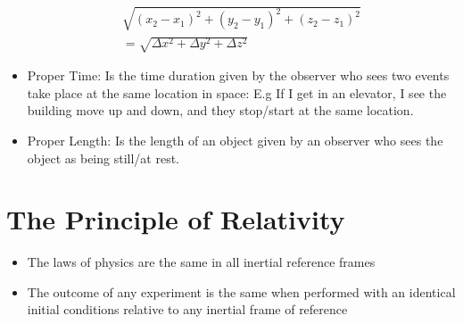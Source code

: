 \documentclass[10pt]{report}
\begin{document}
\begin{itemize}
{\begin{align*}
	\sqrt{\left(x_{2}-x_{1}\right)^{2}+\left(y_{2}-y_{1}\right)^{2}+\left(z_{2}-z_{1}\right)^{2}} \\=\sqrt{\Delta x^{2}+\Delta y^{2}+\Delta z^{2}}
\end{align*}
	}
	\item{Proper Time: Is the time duration given by the observer who sees two events take place at the same location in space: E.g If I get in an elevator, I see the building move up and down, and they stop/start at the same location.}
	\item{Proper Length: Is the length of an object given by an observer who sees the object as being still/at rest.}
\end{itemize}
\section{The Principle of Relativity}
\begin{itemize}
	\item{The laws of physics are the same in all inertial reference frames}
	\item{The outcome of any experiment is the same when performed with an identical initial conditions relative to any inertial frame of reference}
\end{itemize}
\end{document}
